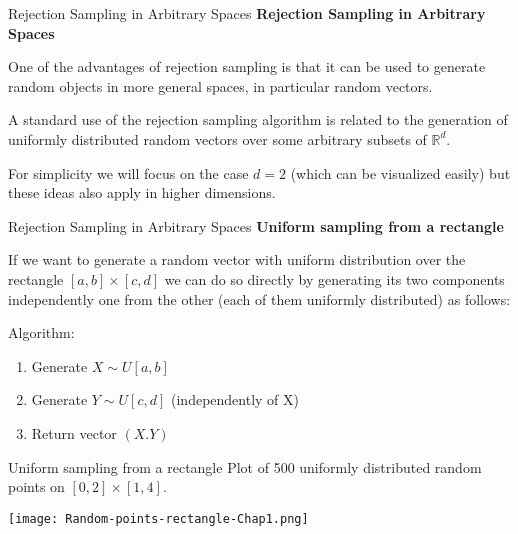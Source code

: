 \documentclass[8pt]{beamer}
\begin{document}
\begin{frame}{Rejection Sampling in Arbitrary Spaces}
\textbf{Rejection Sampling in Arbitrary Spaces}

\vspace{2mm}

One of the advantages of rejection sampling is that it can be used to generate random objects in more general spaces, in particular random vectors.

\vspace{2mm}

A standard use of the rejection sampling algorithm is related to the generation of uniformly distributed random vectors over some arbitrary subsets of $\mathbb{R}^d$.

\vspace{2mm}

For simplicity we will focus on the case $d=2$ (which can be visualized easily) but these ideas also apply in higher dimensions.
\end{frame}

\begin{frame}{Rejection Sampling in Arbitrary Spaces}
\textbf{Uniform sampling from a rectangle}

\vspace{2mm}

If we want to generate a random vector with uniform distribution over the rectangle $[a,b]\times[c,d]$ we can do so directly by generating its two components independently one from the other (each of them uniformly distributed) as follows:
\vspace{2mm}

\alert{Algorithm}:

\begin{enumerate}
\item Generate $X \sim U[a,b]$
\item Generate $Y \sim U[c,d]$ (independently of X)
\item Return vector $(X.Y)$
\end{enumerate}
\end{frame}

\begin{frame}{Uniform sampling from a rectangle}
Plot of 500 uniformly distributed random points on $[0,2]\times[1,4]$.

\begin{center}
\texttt{[image: Random-points-rectangle-Chap1.png]}
\end{center}
\end{frame}
\end{document}
